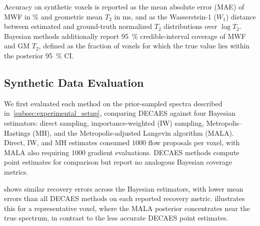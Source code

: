 \begin{table}[htbp]
    \centering
    \caption{Reference mixing diagnostics before pooling or thinning, across the voxels listed.
        The $\hat{R}$ maximum is over base coordinates, and bulk/tail effective-sample minima are over spectrum bins.
        Errors count retained \gls*{HMC} iterations with any numerical error and divergent \gls*{NUTS} transitions, respectively.}
    \label{tab:reference_diagnostics}
    
\end{table}

Accuracy on synthetic voxels is reported as the mean absolute error (\gls*{MAE}) of \gls*{MWF} in \si{\percent} and geometric mean $T_2$ in \si{\ms}, and as the Wasserstein-1 ($W_1$) distance between estimated and ground-truth normalized $T_2$ distributions over $\log T_2$.
Bayesian methods additionally report \SI{95}{\percent} credible-interval coverage of \gls*{MWF} and GM $T_2$, defined as the fraction of voxels for which the true value lies within the posterior \SI{95}{\percent} \gls*{CI}.

\subsection{Synthetic Data Evaluation}\label{subsec:synthetic_eval}

We first evaluated each method on the prior-sampled spectra described in~\cref{subsec:experimental_setup}, comparing \gls*{DECAES} against four Bayesian estimators:
direct sampling, importance-weighted (\gls*{IW}) sampling, Metropolis--Hastings (\gls*{MH}), and the Metropolis-adjusted Langevin algorithm (\gls*{MALA}).
Direct, \gls*{IW}, and \gls*{MH} estimates consumed $\num{1000}$ flow proposals per voxel, with \gls*{MALA} also requiring $\num{1000}$ gradient evaluations.
\gls*{DECAES} methods compute point estimates for comparison but report no analogous Bayesian coverage metrics.

 shows similar recovery errors across the Bayesian estimators, with lower mean errors than all \gls*{DECAES} methods on each reported recovery metric.
 illustrates this for a representative voxel, where the \gls*{MALA} posterior concentrates near the true spectrum, in contrast to the less accurate \gls*{DECAES} point estimates.

\begin{table}[htbp]
    \centering
    \caption{$T_2$ distribution recovery metrics over a batch of \num{1000} spectra drawn from the learned prior at \gls*{SNR} levels of $\SI{30}{\decibel}$, $\SI{40}{\decibel}$, and $\SI{50}{\decibel}$.
        \gls*{MWF} \gls*{MAE} in \si{\percent}, geometric mean $T_2$ \gls*{MAE}, and Wasserstein-1 ($W_1$) distances between estimated and ground-truth $T_2$ distributions are reported as mean $\pm$ standard deviation.
        \SI{95}{\percent} \gls*{CI} coverage of \gls*{MWF} and GM $T_2$ is reported for the Bayesian methods.
        Bold marks the lowest displayed mean error at each \gls*{SNR}.}
    \label{tab:synthetic_results}
    
\end{table}

